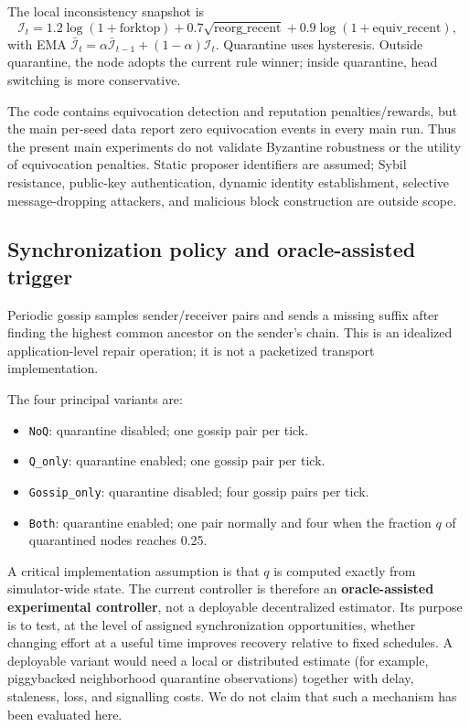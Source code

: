 \documentclass[11pt]{article}
\begin{document}
The local inconsistency snapshot is
\[
\mathcal I_t=1.2\log(1+\mathrm{forktop})+0.7\sqrt{\mathrm{reorg\_recent}}+0.9\log(1+\mathrm{equiv\_recent}),
\]
with EMA $\bar{\mathcal I}_t=\alpha\bar{\mathcal I}_{t-1}+(1-\alpha)\mathcal I_t$. Quarantine uses hysteresis. Outside quarantine, the node adopts the current rule winner; inside quarantine, head switching is more conservative.

The code contains equivocation detection and reputation penalties/rewards, but the main per-seed data report zero equivocation events in every main run. Thus the present main experiments do not validate Byzantine robustness or the utility of equivocation penalties. Static proposer identifiers are assumed; Sybil resistance, public-key authentication, dynamic identity establishment, selective message-dropping attackers, and malicious block construction are outside scope.

\subsection{Synchronization policy and oracle-assisted trigger}
Periodic gossip samples sender/receiver pairs and sends a missing suffix after finding the highest common ancestor on the sender's chain. This is an idealized application-level repair operation; it is not a packetized transport implementation.

The four principal variants are:
\begin{itemize}
\item \texttt{NoQ}: quarantine disabled; one gossip pair per tick.
\item \texttt{Q\_only}: quarantine enabled; one gossip pair per tick.
\item \texttt{Gossip\_only}: quarantine disabled; four gossip pairs per tick.
\item \texttt{Both}: quarantine enabled; one pair normally and four when the fraction $q$ of quarantined nodes reaches 0.25.
\end{itemize}

A critical implementation assumption is that $q$ is computed exactly from simulator-wide state. The current controller is therefore an \textbf{oracle-assisted experimental controller}, not a deployable decentralized estimator. Its purpose is to test, at the level of assigned synchronization opportunities, whether changing effort at a useful time improves recovery relative to fixed schedules. A deployable variant would need a local or distributed estimate (for example, piggybacked neighborhood quarantine observations) together with delay, staleness, loss, and signalling costs. We do not claim that such a mechanism has been evaluated here.
\end{document}
